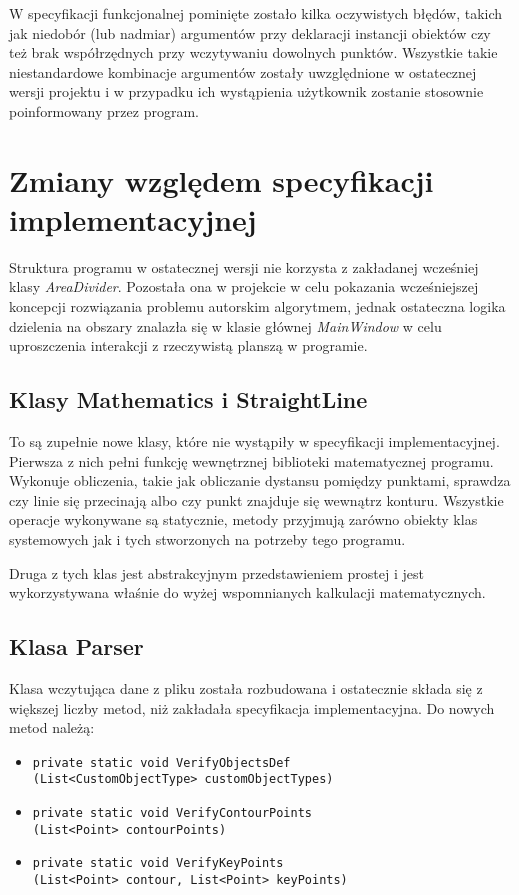 \documentclass[a4paper,12pt]{article}
\newcommand\tab[1][0.6cm]{\hspace*{#1}}
\begin{document}
W specyfikacji funkcjonalnej pominięte zostało kilka oczywistych błędów, takich jak niedobór (lub nadmiar) argumentów przy deklaracji instancji obiektów czy też brak współrzędnych przy wczytywaniu dowolnych punktów. Wszystkie takie niestandardowe kombinacje argumentów zostały uwzględnione w ostatecznej wersji projektu i w przypadku ich wystąpienia użytkownik zostanie stosownie poinformowany przez program.

\section{Zmiany względem specyfikacji implementacyjnej}

\tab Struktura programu w ostatecznej wersji nie korzysta z zakładanej wcześniej klasy \textit{AreaDivider}. Pozostała ona w projekcie w celu pokazania wcześniejszej koncepcji rozwiązania problemu autorskim algorytmem, jednak ostateczna logika dzielenia na obszary znalazła się w klasie głównej \textit{MainWindow} w celu uproszczenia interakcji z rzeczywistą planszą w programie. 

\subsection{Klasy Mathematics i StraightLine}

\tab To są zupełnie nowe klasy, które nie wystąpiły w specyfikacji implementacyjnej. Pierwsza z nich pełni funkcję wewnętrznej biblioteki matematycznej programu. Wykonuje obliczenia, takie jak obliczanie dystansu pomiędzy punktami, sprawdza czy linie się przecinają albo czy punkt znajduje się wewnątrz konturu. Wszystkie operacje wykonywane są statycznie, metody przyjmują zarówno obiekty klas systemowych jak i tych stworzonych na potrzeby tego programu.

Druga z tych klas jest abstrakcyjnym przedstawieniem prostej i jest wykorzystywana właśnie do wyżej wspomnianych kalkulacji matematycznych.

\subsection{Klasa Parser}

\tab Klasa wczytująca dane z pliku została rozbudowana i ostatecznie składa się z większej liczby metod, niż zakładała specyfikacja implementacyjna. Do nowych metod należą: 

\begin{itemize}
\item \begin{lstlisting}
private static void VerifyObjectsDef
(List<CustomObjectType> customObjectTypes)
\end{lstlisting}
\item \begin{lstlisting}
private static void VerifyContourPoints
(List<Point> contourPoints)
\end{lstlisting}
\item \begin{lstlisting}
private static void VerifyKeyPoints
(List<Point> contour, List<Point> keyPoints)
\end{lstlisting}
\end{itemize}
\end{document}
